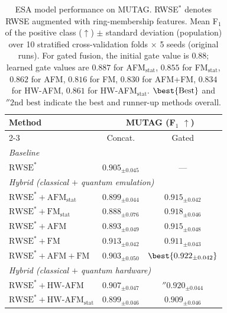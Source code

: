 \begin{table}[t]
\caption{%
ESA model performance on MUTAG.
RWSE$^{*}$ denotes RWSE augmented with ring-membership features.
Mean F$_1$ of the positive class ($\uparrow$) $\pm$ standard deviation (population) over 10 stratified cross-validation folds $\times$ 5 seeds (original runs).
For gated fusion, the initial gate value is $0.88$; learned gate values are $0.887$ for AFM$_{\mathrm{stat}}$, $0.855$ for FM$_{\mathrm{stat}}$, $0.862$ for AFM, $0.816$ for FM, $0.830$ for AFM+FM, $0.834$ for HW-AFM, $0.861$ for HW-AFM$_{\mathrm{stat}}$.
\mbox{$\best{\text{Best}}$} and \mbox{$\second{\text{2nd best}}$} indicate the best and runner-up methods overall.
}
\label{tab:mutag-esa}
\centering
\small
\begin{tabular}{l c c}
\toprule
\multirow{2}{*}{Method} & \multicolumn{2}{c}{MUTAG (F$_1$ $\uparrow$)} \\
\cmidrule(lr){2-3}
 & Concat. & Gated \\
\midrule
\multicolumn{3}{l}{\textit{Baseline}} \\
  $\text{RWSE}^{*}$ & $0.905{_{\pm 0.045}}$ & --- \\
\midrule
\multicolumn{3}{l}{\textit{Hybrid (classical ${+}$ quantum emulation)}} \\
  $\text{RWSE}^{*}{+}\text{AFM}_{\text{stat}}$ & $0.899{_{\pm 0.044}}$ & $0.915{_{\pm 0.042}}$ \\
  $\text{RWSE}^{*}{+}\text{FM}_{\text{stat}}$ & $0.888{_{\pm 0.076}}$ & $0.918{_{\pm 0.046}}$ \\
  $\text{RWSE}^{*}{+}\text{AFM}$ & $0.893{_{\pm 0.049}}$ & $0.915{_{\pm 0.048}}$ \\
  $\text{RWSE}^{*}{+}\text{FM}$ & $0.913{_{\pm 0.042}}$ & $0.911{_{\pm 0.043}}$ \\
  $\text{RWSE}^{*}{+}\text{AFM}{+}\text{FM}$ & $0.903{_{\pm 0.050}}$ & $\best{0.922{_{\pm 0.042}}}$ \\
\midrule
\multicolumn{3}{l}{\textit{Hybrid (classical ${+}$ quantum hardware)}} \\
  $\text{RWSE}^{*}{+}\text{HW-AFM}$ & $0.907{_{\pm 0.047}}$ & $\second{0.920}{_{\pm 0.044}}$ \\
  $\text{RWSE}^{*}{+}\text{HW-AFM}_{\text{stat}}$ & $0.899{_{\pm 0.046}}$ & $0.909{_{\pm 0.046}}$ \\
\bottomrule
\end{tabular}
\end{table}
